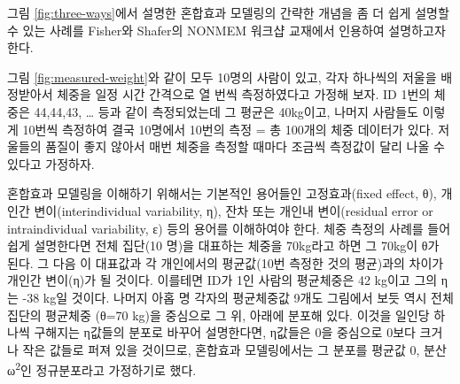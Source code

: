 \documentclass[
  10pt,
  krantz2,
  a4paper]{krantz}
\theoremstyle{definition}
\theoremstyle{definition}
\theoremstyle{definition}
\theoremstyle{remark}
\begin{document}
그림 \ref{fig:three-ways}에서 설명한 혼합효과 모델링의 간략한 개념을 좀 더 쉽게 설명할 수 있는 사례를 Fisher와 Shafer의 NONMEM 워크샵 교재에서 인용하여 설명하고자 한다.

그림 \ref{fig:measured-weight}와 같이 모두 10명의 사람이 있고, 각자 하나씩의 저울을 배정받아서 체중을 일정 시간 간격으로 열 번씩 측정하였다고 가정해 보자. ID 1번의 체중은 44,44,43, \ldots{} 등과 같이 측정되었는데 그 평균은 40kg이고, 나머지 사람들도 이렇게 10번씩 측정하여 결국 10명에서 10번의 측정 = 총 100개의 체중 데이터가 있다. 저울들의 품질이 좋지 않아서 매번 체중을 측정할 때마다 조금씩 측정값이 달리 나올 수 있다고 가정하자.

혼합효과 모델링을 이해하기 위해서는 기본적인 용어들인 고정효과(fixed effect, θ), 개인간 변이(interindividual variability, η), 잔차 또는 개인내 변이(residual error or intraindividual variability, ε) 등의 용어를 이해하여야 한다. 체중 측정의 사례를 들어 쉽게 설명한다면 전체 집단(10 명)을 대표하는 체중을 70kg라고 하면 그 70kg이 θ가 된다. 그 다음 이 대표값과 각 개인에서의 평균값(10번 측정한 것의 평균)과의 차이가 개인간 변이(η)가 될 것이다. 이를테면 ID가 1인 사람의 평균체중은 42 kg이고 그의 η는 -38 kg일 것이다. 나머지 아홉 명 각자의 평균체중값 9개도 그림에서 보듯 역시 전체 집단의 평균체중 (θ=70 kg)을 중심으로 그 위, 아래에 분포해 있다. 이것을 일인당 하나씩 구해지는 η값들의 분포로 바꾸어 설명한다면, η값들은 0을 중심으로 0보다 크거나 작은 값들로 퍼져 있을 것이므로, 혼합효과 모델링에서는 그 분포를 평균값 0, 분산 ω\textsuperscript{2}인 정규분포라고 가정하기로 했다.
\end{document}
